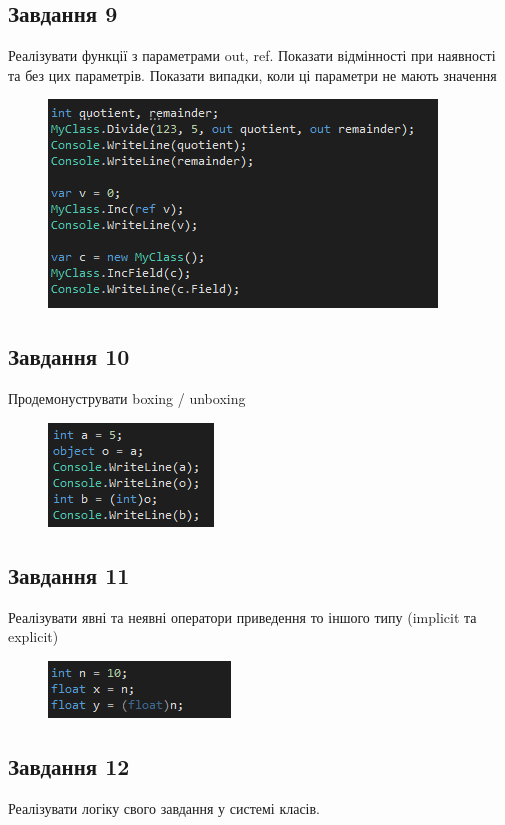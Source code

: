 \documentclass[oneside,14pt]{extarticle}
\begin{document}
\begin{normalsize}
	\subsection*{Завдання 9}
	Реалізувати функції з параметрами out, ref. Показати відмінності при наявності та
	без цих параметрів. Показати випадки, коли ці параметри не мають значення
	\begin{figure}[H]
		\centering
		\includegraphics[scale=0.7]{19}
	\end{figure}
	
	\subsection*{Завдання 10}
	Продемонуструвати boxing / unboxing
	\begin{figure}[H]
		\centering
		\includegraphics[scale=0.7]{110}
	\end{figure}
	
	\subsection*{Завдання 11}
	Реалізувати явні та неявні оператори приведення то іншого типу (implicit та explicit)
	\begin{figure}[H]
		\centering
		\includegraphics[scale=0.7]{111}
	\end{figure}
	
	\subsection*{Завдання 12}
	Реалізувати логіку свого завдання у системі класів.
	

\end{normalsize}
\end{document}
